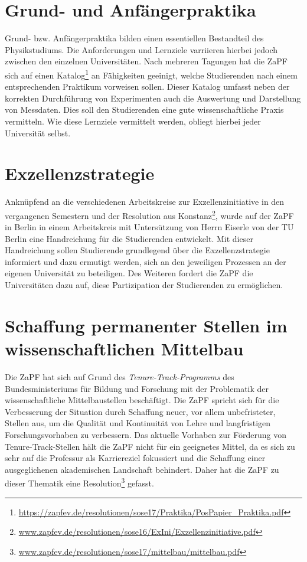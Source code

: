 \documentclass[a4paper]{article}
\begin{document}
\section*{Grund- und Anfängerpraktika}
Grund- bzw. Anfängerpraktika bilden einen essentiellen Bestandteil des Physikstudiums. Die Anforderungen und Lernziele varriieren hierbei jedoch zwischen den einzelnen Universitäten. Nach mehreren Tagungen hat die ZaPF sich auf einen Katalog\footnote{\href{https://zapfev.de/resolutionen/sose17/Praktika/PosPapier_Praktika.pdf}{\url{https://zapfev.de/resolutionen/sose17/Praktika/PosPapier_Praktika.pdf}}} an Fähigkeiten geeinigt, welche Studierenden nach einem entsprechenden Praktikum vorweisen sollen. Dieser Katalog umfasst neben der korrekten Durchführung von Experimenten auch die Auswertung und Darstellung von Messdaten. Dies soll den Studierenden eine gute wissenschaftliche Praxis vermitteln. 
Wie diese Lernziele vermittelt werden, obliegt hierbei jeder Universität selbst.

\section*{Exzellenzstrategie}
Anknüpfend an die verschiedenen Arbeitskreise zur Exzellenzinitiative in den vergangenen Semestern  und der Resolution aus Konstanz\footnote{\href{https://zapfev.de/resolutionen/sose16/ExIni/Exzellenzinitiative.pdf}{\url{www.zapfev.de/resolutionen/sose16/ExIni/Exzellenzinitiative.pdf}}}, wurde auf der ZaPF in Berlin in einem Arbeitskreis mit Untersützung von Herrn Eiserle von der TU Berlin eine Handreichung für die Studierenden entwickelt. Mit dieser Handreichung sollen Studierende grundlegend über die Exzellenzstrategie informiert und dazu ermutigt werden, sich an den jeweiligen Prozessen an der eigenen Universität zu beteiligen. Des Weiteren fordert die ZaPF die Universitäten dazu auf, diese Partizipation der Studierenden zu ermöglichen. 

\section*{Schaffung permanenter Stellen im wissenschaftlichen Mittelbau}
Die ZaPF hat sich auf Grund des \emph{Tenure-Track-Programms} des Bundesministeriums für Bildung und Forschung mit der Problematik der wissenschaftliche Mittelbaustellen beschäftigt. Die ZaPF spricht sich für die Verbesserung der Situation durch Schaffung neuer, vor allem unbefristeter, Stellen aus, um die Qualität und Kontinuität von Lehre und langfristigen Forschungsvorhaben zu verbessern. Das aktuelle Vorhaben zur Förderung von Tenure-Track-Stellen hält die ZaPF nicht für ein geeignetes Mittel, da es sich zu sehr auf die Professur als Karriereziel fokussiert und die Schaffung einer ausgeglichenen akademischen Landschaft behindert. Daher hat die ZaPF zu dieser Thematik eine Resolution\footnote{\href{https://zapfev.de/resolutionen/sose17/mittelbau/mittelbau.pdf}{\url{www.zapfev.de/resolutionen/sose17/mittelbau/mittelbau.pdf}}} gefasst.
\end{document}
